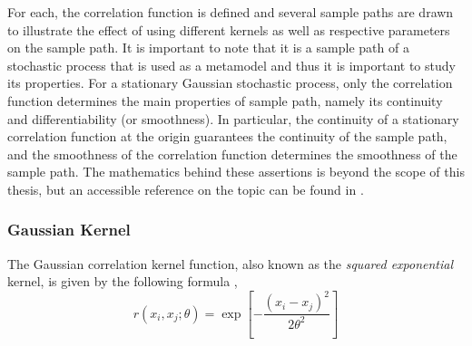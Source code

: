 For each, the correlation function is defined and several sample paths are drawn to illustrate the effect of using different kernels as well as respective parameters on the sample path.
It is important to note that it is a sample path of a stochastic process that is used as a metamodel and thus it is important to study its properties.
For a stationary Gaussian stochastic process, only the correlation function determines the main properties of sample path, namely its continuity and differentiability (or smoothness).
In particular, the continuity of a stationary correlation function at the origin guarantees the continuity of the sample path, 
and the smoothness of the correlation function determines the smoothness of the sample path.
The mathematics behind these assertions is beyond the scope of this thesis, but an accessible reference on the topic can be found in \cite{Abrahamsen1997}.

\subsubsection{Gaussian Kernel}\label{subsub:gp_gaussian_cov}

The Gaussian correlation kernel function, also known as the \emph{squared exponential} kernel, is given by the following formula \cite{Roustant2012,Santner2003,Rasmussen2006},
\begin{equation}
	r(x_i, x_j; \theta) = \exp{\left[- \frac{(x_i - x_j)^2}{2 \theta^2}\right]}
\label{eq:gaussian_kernel}
\end{equation}

